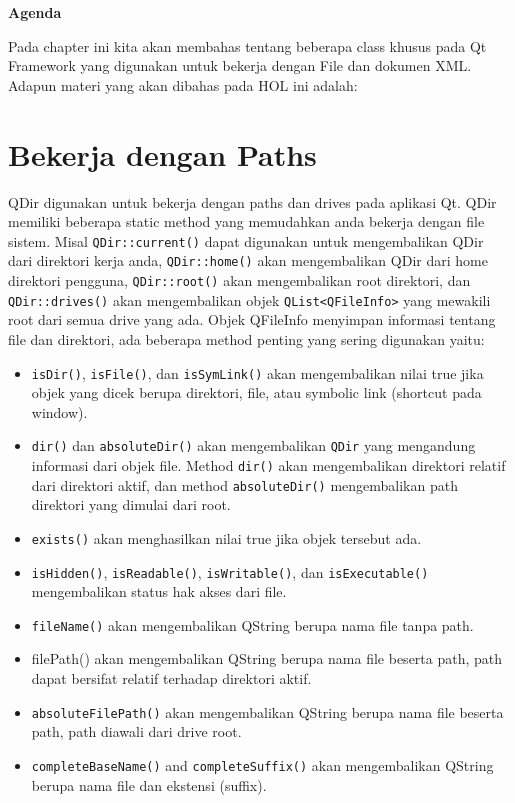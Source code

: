\textbf{Agenda}

Pada chapter ini kita akan membahas tentang beberapa class khusus pada
Qt Framework yang digunakan untuk bekerja dengan File dan dokumen XML.
Adapun materi yang akan dibahas pada HOL ini adalah:

\minitoc

\section{Bekerja dengan Paths}\label{bekerja-dengan-paths}

QDir digunakan untuk bekerja dengan paths dan drives pada aplikasi Qt.
QDir memiliki beberapa static method yang memudahkan anda bekerja dengan
file sistem. Misal \texttt{QDir::current()} dapat digunakan untuk
mengembalikan QDir dari direktori kerja anda, \texttt{QDir::home()} akan
mengembalikan QDir dari home direktori pengguna, \texttt{QDir::root()}
akan mengembalikan root direktori, dan \texttt{QDir::drives()} akan
mengembalikan objek \texttt{QList\textless{}QFileInfo\textgreater{}}
yang mewakili root dari semua drive yang ada. Objek QFileInfo menyimpan
informasi tentang file dan direktori, ada beberapa method penting yang
sering digunakan yaitu:

\begin{itemize}

\item
  \texttt{isDir()}, \texttt{isFile()}, dan \texttt{isSymLink()} akan
  mengembalikan nilai true jika objek yang dicek berupa direktori, file,
  atau symbolic link (shortcut pada window).
\item
  \texttt{dir()} dan \texttt{absoluteDir()} akan mengembalikan
  \texttt{QDir} yang mengandung informasi dari objek file. Method
  \texttt{dir()} akan mengembalikan direktori relatif dari direktori
  aktif, dan method \texttt{absoluteDir()} mengembalikan path direktori
  yang dimulai dari root.
\item
  \texttt{exists()} akan menghasilkan nilai true jika objek tersebut
  ada.
\item
  \texttt{isHidden()}, \texttt{isReadable()}, \texttt{isWritable()}, dan
  \texttt{isExecutable()} mengembalikan status hak akses dari file.
\item
  \texttt{fileName()} akan mengembalikan QString berupa nama file tanpa
  path.
\item
  filePath() akan mengembalikan QString berupa nama file beserta path,
  path dapat bersifat relatif terhadap direktori aktif.
\item
  \texttt{absoluteFilePath()} akan mengembalikan QString berupa nama
  file beserta path, path diawali dari drive root.
\item
  \texttt{completeBaseName()} and \texttt{completeSuffix()} akan
  mengembalikan QString berupa nama file dan ekstensi (suffix).
\end{itemize}

